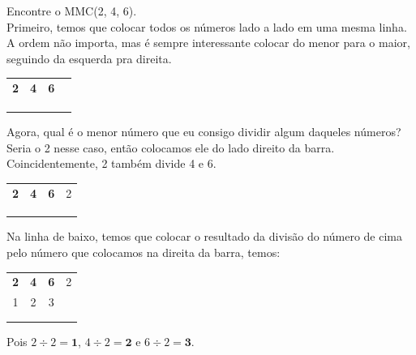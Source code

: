 \begin{exemplo}
    Encontre o MMC(2, 4, 6).\\

    Primeiro, temos que colocar todos os números lado a lado em uma mesma linha. A ordem não importa, mas é sempre interessante colocar do menor para o maior, seguindo da esquerda pra direita.

    \begin{table}[H]
    \centering
    \begin{tabular}{ccc|c}
        \textbf{2} & \textbf{4} & \textbf{6} & \\
         &  & \\
         &  & \\
         &  & \\
    \end{tabular}
    \end{table}

    Agora, qual é o menor número que eu consigo dividir algum daqueles números? Seria o 2 nesse caso, então colocamos ele do lado direito da barra. Coincidentemente, 2 também divide 4 e 6.

    \begin{table}[H]
    \centering
    \begin{tabular}{ccc|c}
        \textbf{2} & \textbf{4} & \textbf{6} & 2\\
         &  & \\
         &  & \\
         &  & \\
    \end{tabular}
    \end{table}

    Na linha de baixo, temos que colocar o resultado da divisão do número de cima pelo número que colocamos na direita da barra, temos:

    \begin{table}[H]
    \centering
    \begin{tabular}{ccc|c}
        \textbf{2} & \textbf{4} & \textbf{6} & 2\\
         1 & 2 & 3\\
         &  & \\
         &  & \\
    \end{tabular}
    \end{table}

    Pois \(2\div2=\textbf{1}\), \(4\div2=\textbf{2}\) e \(6\div2=\textbf{3}\).


\end{exemplo}
